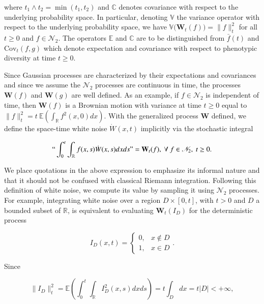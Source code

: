 \documentclass[]{elsarticle} %
\begin{document}
where \(t_1\wedge t_2=\min(t_1,t_2)\) and \(\mathbb{C}\) denotes
covariance with respect to the underlying probability space. In
particular, denoting \(\mathbb{V}\) the variance operator with respect
to the underlying probability space, we have
\(\mathbb{V}\big(\mathbf W_t(f)\big)=\|f\|_t^2\) for all \(t\geq0\) and
\(f\in\mathscr{N}_2\). The operators \(\mathbb{E}\) and \(\mathbb{C}\)
are to be distinguished from \(\bar f(t)\) and \(\mathrm{Cov}_t(f,g)\)
which denote expectation and covariance with respect to phenotypic
diversity at time \(t\geq0\).

Since Gaussian processes are characterized by their expectations and
covariances and since we assume the \(\mathscr{N}_2\) processes are
continuous in time, the processes \(\mathbf W(f)\) and \(\mathbf W(g)\)
are well defined. As an example, if \(f\in\mathscr{N}_2\) is independent
of time, then \(\mathbf W(f)\) is a Brownian motion with variance at
time \(t\geq0\) equal to
\(\|f\|_t^2=t \ \mathbb{E}(\int_\mathbb{R}f^2(x,0)dx)\). With the
generalized process \(\mathbf W\) defined, we define the space-time
white noise \(\dot W(x,t)\) implicitly via the stochastic integral

\begin{equation}\label{informal}
``\int_0^t\int_\mathbb{R}f(x,s)\dot W(x,s)dxds"=\mathbf W_t(f), \ \forall \ f\in\mathscr{N}_2, \ t\geq0.
\end{equation}

We place quotations in the above expression to emphasize its informal
nature and that it should not be confused with classical Riemann
integration. Following this definition of white noise, we compute its
value by sampling it using \(\mathscr{N}_2\) processes. For example,
integrating white noise over a region \(D\times[0,t]\), with \(t>0\) and
\(D\) a bounded subset of \(\mathbb{R}\), is equivalent to evaluating
\(\mathbf W_t(I_D)\) for the deterministic process

\begin{equation}
I_D(x,t)=\left\{\begin{matrix}
0, & x\notin D \\
1, & x\in D
\end{matrix}\right..
\end{equation}

Since

\begin{equation}
\|I_D\|_t^2=\mathbb{E}\left(\int_0^t\int_\mathbb{R}I_D^2(x,s)dxds\right)=t\int_Ddx=t|D|<+\infty, 
\end{equation}
\end{document}
